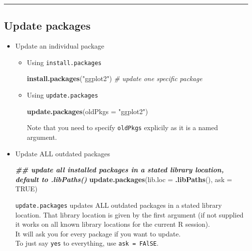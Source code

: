 \documentclass[
  a4paper,
  twoside,
  openright]{book}
\newenvironment{Shaded}{\begin{snugshade}}{\end{snugshade}}
\newcommand{\AttributeTok}[1]{\textcolor[rgb]{0.13,0.29,0.53}{#1}}
\newcommand{\CommentTok}[1]{\textcolor[rgb]{0.56,0.35,0.01}{\textit{#1}}}
\newcommand{\ConstantTok}[1]{\textcolor[rgb]{0.56,0.35,0.01}{#1}}
\newcommand{\DocumentationTok}[1]{\textcolor[rgb]{0.56,0.35,0.01}{\textbf{\textit{#1}}}}
\newcommand{\FunctionTok}[1]{\textcolor[rgb]{0.13,0.29,0.53}{\textbf{#1}}}
\newcommand{\NormalTok}[1]{#1}
\newcommand{\StringTok}[1]{\textcolor[rgb]{0.31,0.60,0.02}{#1}}
\theoremstyle{definition}
\theoremstyle{definition}
\theoremstyle{definition}
\theoremstyle{definition}
\theoremstyle{remark}
\begin{document}
\begin{center}\rule{0.5\linewidth}{0.5pt}\end{center}

\subsection{Update packages}\label{update-packages}

\begin{itemize}
\item
  Update an individual package

  \begin{itemize}
  \item
    Using \texttt{install.packages}

\begin{Shaded}
\begin{Highlighting}[]
\FunctionTok{install.packages}\NormalTok{(}\StringTok{"ggplot2"}\NormalTok{) }\CommentTok{\# update one specific package}
\end{Highlighting}
\end{Shaded}
  \item
    Using \texttt{update.packages}

\begin{Shaded}
\begin{Highlighting}[]
\FunctionTok{update.packages}\NormalTok{(}\AttributeTok{oldPkgs =} \StringTok{"ggplot2"}\NormalTok{)}
\end{Highlighting}
\end{Shaded}

    Note that you need to {specify \texttt{oldPkgs} explicily} as it is a named argument.
  \end{itemize}
\item
  Update ALL outdated packages

\begin{Shaded}
\begin{Highlighting}[]
\DocumentationTok{\#\# update all installed packages in a stated library location, default to \textasciigrave{}.libPaths()\textasciigrave{}}
\FunctionTok{update.packages}\NormalTok{(}\AttributeTok{lib.loc =} \FunctionTok{.libPaths}\NormalTok{(), }\AttributeTok{ask =} \ConstantTok{TRUE}\NormalTok{) }
\end{Highlighting}
\end{Shaded}

  \texttt{update.packages} updates ALL outdated packages in a stated library location. That library location is given by the first argument (if not supplied it works on all known library locations for the current R session).\\
  It will ask you for every package if you want to update.\\
  To just say \texttt{yes} to everything, use \texttt{ask\ =\ FAlSE}.


\end{itemize}
\end{document}
